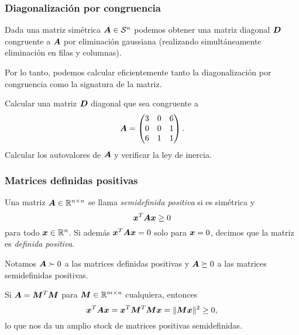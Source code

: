 \documentclass[aspectratio=169,12pt,spanish]{beamer}
\begin{document}

\begin{frame}
\frametitle{Diagonalización por congruencia}

Dada una matriz simétrica $\bm{A} \in {\mathcal S^n}$ podemos obtener una matriz diagonal $\bm{D}$ congruente a $\bm{A}$ por eliminación gaussiana (realizando simultáneamente eliminación en filas y columnas).

Por lo tanto, podemos calcular eficientemente tanto la diagonalización por congruencia como la signatura de la matriz.

\begin{example}
Calcular una matriz $\bm{D}$ diagonal que sea congruente a
$$
\bm{A} =
\begin{pmatrix}
3 & 0 & 6 \\
0 & 0 & 1 \\
6 & 1 & 1
\end{pmatrix}.
$$
Calcular los autovalores de $\bm{A}$ y verificar la ley de inercia.
\end{example}

\end{frame}


\begin{frame}
\frametitle{Matrices definidas positivas}

Una matriz $\bm{A} \in \mathbb{R}^{n \times n}$ se llama \emph{semidefinida positiva} si es simétrica y
$$
\bm{x}^T \bm{A} \bm{x}  \ge 0
$$
para todo $\bm{x} \in \mathbb{R}^n$. Si además $\bm{x}^T \bm{A} \bm{x} = 0$ solo para $\bm{x} = 0$, decimos que la matriz es \emph{definida positiva}.

Notamos $\bm{A} \succ 0$ a las matrices definidas positivas y $\bm{A} \succeq 0$ a las matrices semidefinidas positivas.

Si $\bm{A} = \bm{M}^T \bm{M}$ para $\bm{M} \in \mathbb{R}^{m \times n}$ cualquiera, entonces
$$
\bm{x}^T \bm{A} \bm{x} = \bm{x}^T \bm{M}^T \bm{M} \bm{x} = \| \bm{M} \bm{x} \|^2 \ge 0,
$$
lo que nos da un amplio stock de matrices positivas semidefinidas.

\end{frame}

\end{document}
